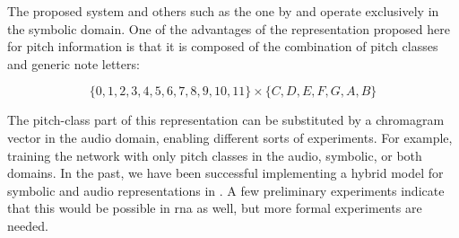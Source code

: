 
The proposed system and others such as the one by
\textcite{micchi2021deep} and \textcite{mcleod2021modular}
operate exclusively in the symbolic domain. One of the
advantages of the representation proposed here for pitch
information is that it is composed of the combination of
pitch classes and generic note letters:

\begin{equation}
    \{0, 1, 2, 3, 4, 5, 6, 7, 8, 9, 10, 11\} \times \{C, D, E, F, G, A, B\}
\end{equation}

The pitch-class part of this representation can be
substituted by a chromagram vector in the audio domain,
enabling different sorts of experiments. For example,
training the network with only pitch classes in the audio,
symbolic, or both domains. In the past, we have been
successful implementing a hybrid model for symbolic and
audio representations in \textcite{napoleslopez2019effects}.
A few preliminary experiments indicate that this would be
possible in \gls{rna} as well, but more formal experiments
are needed.
